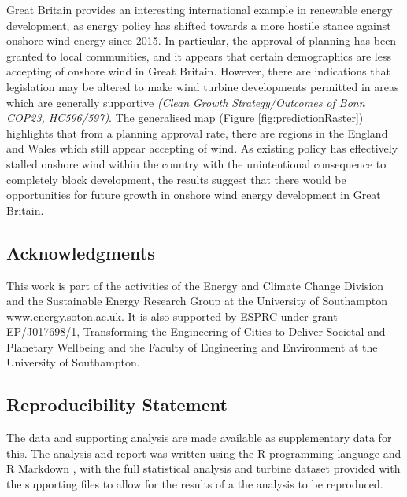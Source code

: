 \documentclass[a4paper,]{article}
\theoremstyle{definition}
\theoremstyle{definition}
\theoremstyle{definition}
\theoremstyle{remark}
\begin{document}
Great Britain provides an interesting international example in renewable energy development, as energy policy has shifted towards a more hostile stance against onshore wind energy since 2015. In particular, the approval of planning has been granted to local communities, and it appears that certain demographics are less accepting of onshore wind in Great Britain. However, there are indications that legislation may be altered to make wind turbine developments permitted in areas which are generally supportive \emph{(Clean Growth Strategy/Outcomes of Bonn COP23, HC596/597)}. The generalised map (Figure \ref{fig:predictionRaster}) highlights that from a planning approval rate, there are regions in the England and Wales which still appear accepting of wind. As existing policy has effectively stalled onshore wind within the country with the unintentional consequence to completely block development, the results suggest that there would be opportunities for future growth in onshore wind energy development in Great Britain.

\hypertarget{acknowledgments}{%
\subsection*{Acknowledgments}\label{acknowledgments}}

This work is part of the activities of the Energy and Climate Change Division and the Sustainable Energy Research Group at the University of Southampton \url{www.energy.soton.ac.uk}. It is also supported by ESPRC under grant EP/J017698/1, Transforming the Engineering of Cities to Deliver Societal and Planetary Wellbeing and the Faculty of Engineering and Environment at the University of Southampton.

\hypertarget{reproducibility-statement}{%
\subsection*{Reproducibility Statement}\label{reproducibility-statement}}

The data and supporting analysis are made available as supplementary data for this. The analysis and report was written using the R programming language and R Markdown \citep{R-rmarkdown}, with the full statistical analysis and turbine dataset provided with the supporting files to allow for the results of a the analysis to be reproduced.
\end{document}
